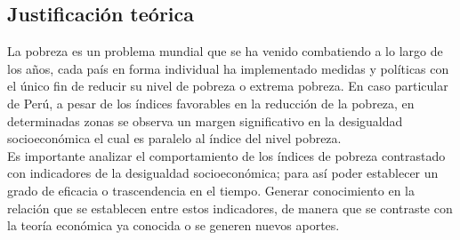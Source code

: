 \subsection{Justificación teórica}
	
La pobreza es un problema mundial que se ha venido combatiendo a lo largo de los años, cada país en forma individual ha implementado medidas y políticas con el único fin de reducir su nivel de pobreza o extrema pobreza. En caso particular de Perú, a pesar de los índices favorables en la reducción de la pobreza, en determinadas zonas se observa un margen significativo en la desigualdad socioeconómica el cual es paralelo al índice del nivel pobreza.\\
Es importante analizar el comportamiento de los índices de pobreza contrastado con indicadores de la desigualdad socioeconómica; para así poder establecer un grado de eficacia o trascendencia en el tiempo. Generar conocimiento en la relación que se establecen entre estos indicadores, de manera que se contraste con la teoría económica ya conocida o se generen nuevos aportes.

